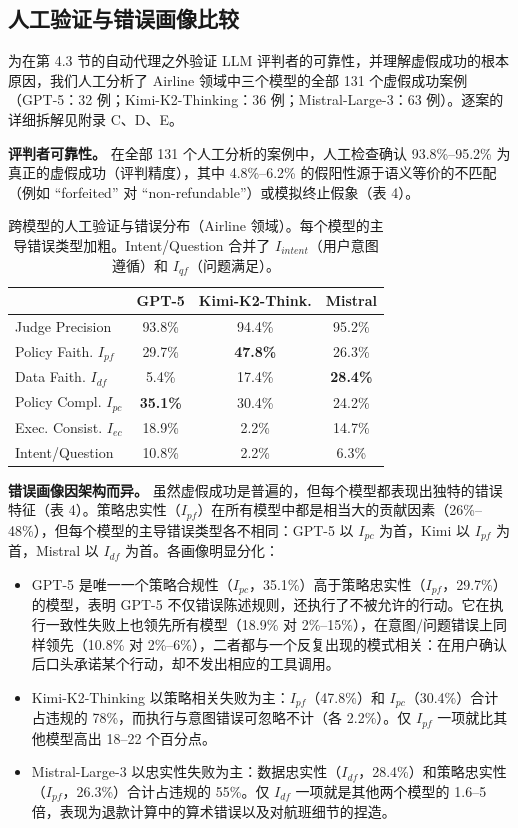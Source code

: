 \documentclass[11pt,UTF8,fontset=fandol]{ctexart}
\begin{document}
\subsection{人工验证与错误画像比较}

为在第 4.3 节的自动代理之外验证 LLM 评判者的可靠性，并理解虚假成功的根本原因，我们人工分析了 Airline 领域中三个模型的全部 131 个虚假成功案例（GPT-5：32 例；Kimi-K2-Thinking：36 例；Mistral-Large-3：63 例）。逐案的详细拆解见附录 C、D、E。

\textbf{评判者可靠性。} 在全部 131 个人工分析的案例中，人工检查确认 93.8\%--95.2\% 为真正的虚假成功（评判精度），其中 4.8\%--6.2\% 的假阳性源于语义等价的不匹配（例如 ``forfeited'' 对 ``non-refundable''）或模拟终止假象（表 4）。

\begin{table}[H]\centering
\caption{跨模型的人工验证与错误分布（Airline 领域）。每个模型的主导错误类型加粗。Intent/Question 合并了 $I_{intent}$（用户意图遵循）和 $I_{qf}$（问题满足）。}
\label{tab:4}
\begin{tabular}{lccc}
\toprule
& GPT-5 & Kimi-K2-Think. & Mistral \\
\midrule
Judge Precision & 93.8\% & 94.4\% & 95.2\% \\
Policy Faith. $I_{pf}$ & 29.7\% & \textbf{47.8\%} & 26.3\% \\
Data Faith. $I_{df}$ & 5.4\% & 17.4\% & \textbf{28.4\%} \\
Policy Compl. $I_{pc}$ & \textbf{35.1\%} & 30.4\% & 24.2\% \\
Exec. Consist. $I_{ec}$ & 18.9\% & 2.2\% & 14.7\% \\
Intent/Question & 10.8\% & 2.2\% & 6.3\% \\
\bottomrule
\end{tabular}
\end{table}

\textbf{错误画像因架构而异。} 虽然虚假成功是普遍的，但每个模型都表现出独特的错误特征（表 4）。策略忠实性（$I_{pf}$）在所有模型中都是相当大的贡献因素（26\%--48\%），但每个模型的主导错误类型各不相同：GPT-5 以 $I_{pc}$ 为首，Kimi 以 $I_{pf}$ 为首，Mistral 以 $I_{df}$ 为首。各画像明显分化：

\begin{itemize}[leftmargin=2em]
\item GPT-5 是唯一一个策略合规性（$I_{pc}$，35.1\%）高于策略忠实性（$I_{pf}$，29.7\%）的模型，表明 GPT-5 不仅错误陈述规则，还执行了不被允许的行动。它在执行一致性失败上也领先所有模型（18.9\% 对 2\%--15\%），在意图/问题错误上同样领先（10.8\% 对 2\%--6\%），二者都与一个反复出现的模式相关：在用户确认后口头承诺某个行动，却不发出相应的工具调用。
\item Kimi-K2-Thinking 以策略相关失败为主：$I_{pf}$（47.8\%）和 $I_{pc}$（30.4\%）合计占违规的 78\%，而执行与意图错误可忽略不计（各 2.2\%）。仅 $I_{pf}$ 一项就比其他模型高出 18--22 个百分点。
\item Mistral-Large-3 以忠实性失败为主：数据忠实性（$I_{df}$，28.4\%）和策略忠实性（$I_{pf}$，26.3\%）合计占违规的 55\%。仅 $I_{df}$ 一项就是其他两个模型的 1.6--5 倍，表现为退款计算中的算术错误以及对航班细节的捏造。
\end{itemize}
\end{document}
